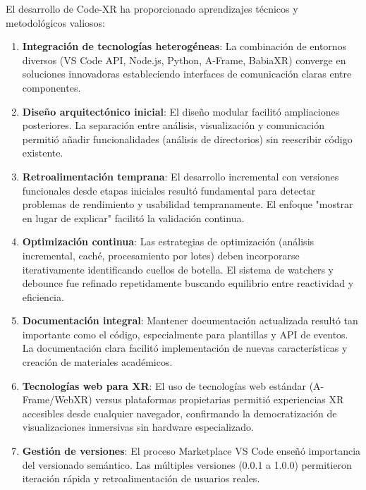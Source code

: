 \documentclass[a4paper, 12pt]{book}
\begin{document}
El desarrollo de Code-XR ha proporcionado aprendizajes técnicos y metodológicos valiosos:

\begin{enumerate}
\item \textbf{Integración de tecnologías heterogéneas}: La combinación de entornos diversos (VS Code API, Node.js, Python, A-Frame, BabiaXR) converge en soluciones innovadoras estableciendo interfaces de comunicación claras entre componentes.
  
  \item \textbf{Diseño arquitectónico inicial}: El diseño modular facilitó ampliaciones posteriores. La separación entre análisis, visualización y comunicación permitió añadir funcionalidades (análisis de directorios) sin reescribir código existente.
  
  \item \textbf{Retroalimentación temprana}: El desarrollo incremental con versiones funcionales desde etapas iniciales resultó fundamental para detectar problemas de rendimiento y usabilidad tempranamente. El enfoque "mostrar en lugar de explicar" facilitó la validación continua.
  
  \item \textbf{Optimización continua}: Las estrategias de optimización (análisis incremental, caché, procesamiento por lotes) deben incorporarse iterativamente identificando cuellos de botella. El sistema de watchers y debounce fue refinado repetidamente buscando equilibrio entre reactividad y eficiencia.
  
  \item \textbf{Documentación integral}: Mantener documentación actualizada resultó tan importante como el código, especialmente para plantillas y API de eventos. La documentación clara facilitó implementación de nuevas características y creación de materiales académicos.
  
  \item \textbf{Tecnologías web para XR}: El uso de tecnologías web estándar (A-Frame/WebXR) versus plataformas propietarias permitió experiencias XR accesibles desde cualquier navegador, confirmando la democratización de visualizaciones inmersivas sin hardware especializado.
  
  \item \textbf{Gestión de versiones}: El proceso Marketplace VS Code enseñó importancia del versionado semántico. Las múltiples versiones (0.0.1 a 1.0.0) permitieron iteración rápida y retroalimentación de usuarios reales.
  

\end{enumerate}
\end{document}
